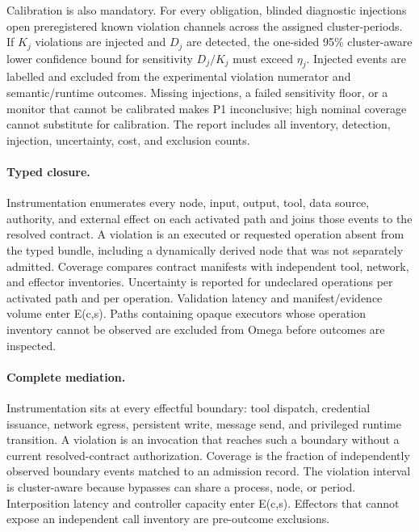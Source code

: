 Calibration is also mandatory. For every obligation, blinded diagnostic injections open preregistered known violation channels across the assigned cluster-periods. If $K_j$ violations are injected and $D_j$ are detected, the one-sided 95\% cluster-aware lower confidence bound for sensitivity $D_j/K_j$ must exceed $\eta_j$. Injected events are labelled and excluded from the experimental violation numerator and semantic/runtime outcomes. Missing injections, a failed sensitivity floor, or a monitor that cannot be calibrated makes P1 inconclusive; high nominal coverage cannot substitute for calibration. The report includes all inventory, detection, injection, uncertainty, cost, and exclusion counts.

\paragraph{Typed closure.}
Instrumentation enumerates every node, input, output, tool, data source, authority, and external effect on each activated path and joins those events to the resolved contract. A violation is an executed or requested operation absent from the typed bundle, including a dynamically derived node that was not separately admitted. Coverage compares contract manifests with independent tool, network, and effector inventories. Uncertainty is reported for undeclared operations per activated path and per operation. Validation latency and manifest/evidence volume enter E(c,s). Paths containing opaque executors whose operation inventory cannot be observed are excluded from Omega before outcomes are inspected.

\paragraph{Complete mediation.}
Instrumentation sits at every effectful boundary: tool dispatch, credential issuance, network egress, persistent write, message send, and privileged runtime transition. A violation is an invocation that reaches such a boundary without a current resolved-contract authorization. Coverage is the fraction of independently observed boundary events matched to an admission record. The violation interval is cluster-aware because bypasses can share a process, node, or period. Interposition latency and controller capacity enter E(c,s). Effectors that cannot expose an independent call inventory are pre-outcome exclusions.


